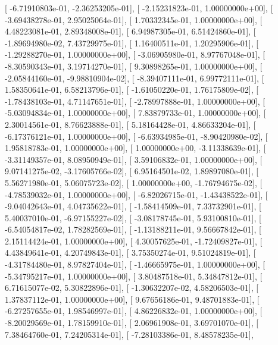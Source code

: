 \documentclass{article}
\begin{document}
       [ -6.71910803e-01,  -2.36253205e-01],
       [ -2.15231823e-01,   1.00000000e+00],
       [ -3.69438278e-01,   2.95025064e-01],
       [  1.70332345e-01,   1.00000000e+00],
       [  4.48223081e-01,   2.89348008e-01],
       [  6.94987305e-01,   6.51424860e-01],
       [ -1.89694980e-02,   7.43729975e-01],
       [  1.16400511e-01,   1.20295906e-01],
       [ -1.29288270e-01,   1.00000000e+00],
       [ -3.06905980e-01,   8.97767048e-01],
       [ -8.30590343e-01,   3.19714270e-01],
       [  9.30898265e-01,   1.00000000e+00],
       [ -2.05844160e-01,  -9.98810904e-02],
       [ -8.39407111e-01,   6.99772111e-01],
       [  1.58350641e-01,   6.58213796e-01],
       [ -1.61050220e-01,   1.76175809e-02],
       [ -1.78438103e-01,   4.71147651e-01],
       [ -2.78997888e-01,   1.00000000e+00],
       [ -5.03094834e-01,   1.00000000e+00],
       [  7.83879733e-01,   1.00000000e+00],
       [  2.30014561e-01,   8.76623888e-01],
       [  5.18164428e-01,   4.86633204e-01],
       [ -6.17376121e-01,   1.00000000e+00],
       [ -6.63934985e-01,  -8.90420980e-02],
       [  1.95818783e-01,   1.00000000e+00],
       [  1.00000000e+00,  -3.11338639e-01],
       [ -3.31149357e-01,   8.08950949e-01],
       [  3.59106832e-01,   1.00000000e+00],
       [  9.07141275e-02,  -3.17605766e-02],
       [  6.95164501e-02,   1.89897080e-01],
       [  5.56271980e-01,   5.06075723e-02],
       [  1.00000000e+00,  -1.76794675e-02],
       [ -4.78539032e-01,   1.00000000e+00],
       [ -6.82026715e-01,  -1.43438522e-01],
       [ -9.04042643e-01,   4.04735622e-01],
       [ -1.58414509e-01,   7.33732901e-01],
       [  5.40037010e-01,  -6.97155227e-02],
       [ -3.08178745e-01,   5.93100810e-01],
       [ -6.54054817e-02,   1.78282569e-01],
       [ -1.13188211e-01,   9.56667842e-01],
       [  2.15114424e-01,   1.00000000e+00],
       [  4.30057625e-01,  -1.72409827e-01],
       [  4.43849641e-01,   4.20749843e-01],
       [  3.75350274e-01,   9.51024819e-01],
       [ -4.31784480e-01,   8.97827404e-01],
       [ -1.46665975e-01,   1.00000000e+00],
       [ -5.34795217e-01,   1.00000000e+00],
       [  3.80487518e-01,   5.34847812e-01],
       [  6.71615077e-02,   5.30822896e-01],
       [ -1.30632207e-02,   4.58206503e-01],
       [  1.37837112e-01,   1.00000000e+00],
       [  9.67656186e-01,   9.48701883e-01],
       [ -6.27257655e-01,   1.98546997e-01],
       [  4.86226832e-01,   1.00000000e+00],
       [ -8.20029569e-01,   1.78159910e-01],
       [  2.06961908e-01,   3.69701070e-01],
       [  7.38464760e-01,   7.24205314e-01],
       [ -7.28103386e-01,   8.48578235e-01],
\end{document}
